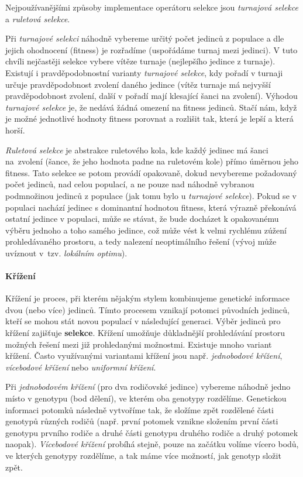 Nejpoužívanějšími způsoby implementace operátoru selekce jsou \emph{turnajová
selekce} a \emph{ruletová selekce}. 

Při \emph{turnajové selekci} náhodně vybereme určitý počet jedinců z
populace a dle jejich ohodnocení (fitness) je rozřadíme (uspořádáme turnaj mezi
jedinci). V tuto chvíli nejčastěji selekce vybere vítěze turnaje (nejlepšího
jedince z turnaje). Existují i pravděpodobnostní varianty \emph{turnajové
selekce}, kdy pořadí v turnaji určuje pravděpodobnost zvolení daného jedince
(vítěz turnaje má nejvyšší pravděpodobnost zvolení, další v pořadí mají
klesající šanci na zvolení). Výhodou \emph{turnajové selekce} je, že nedává
žádná omezení na fitness jedinců. Stačí nám, když je možné jednotlivé hodnoty
fitness porovnat a rozlišit tak, která je lepší a která horší.

\emph{Ruletová selekce} je abstrakce ruletového kola, kde každý jedinec má šanci
na~zvolení (šance, že jeho hodnota padne na ruletovém kole) přímo úměrnou jeho
fitness. Tato selekce se potom provádí opakovaně, dokud nevybereme požadovaný
počet jedinců, nad celou populací, a ne pouze nad náhodně vybranou podmnožinou
jedinců z populace (jak tomu bylo u \emph{turnajové selekce}). Pokud se v
populaci nachází jedinec s dominantní hodnotou fitness, která výrazně překonává
ostatní jedince v populaci, může se stávat, že bude docházet k opakovanému
výběru jednoho a toho samého jedince, což může vést k velmi rychlému zúžení
prohledávaného prostoru, a tedy nalezení neoptimálního řešení (vývoj může
uvíznout v~tzv. \emph{lokálním optimu}).

\paragraph{Křížení}
Křížení je proces, při kterém nějakým stylem kombinujeme genetické informace
dvou (nebo více) jedinců. Tímto procesem vznikají potomci původních jedinců,
kteří se mohou stát novou populací v následující generaci. Výběr jedinců pro
křížení zajišťuje \textbf{selekce}. Křížení umožňuje důkladnější prohledávání
prostoru možných řešení mezi již prohledanými možnostmi. Existuje mnoho variant
křížení. Často využívanými variantami křížení jsou např. \emph{jednobodové
křížení}, \emph{vícebodové křížení} nebo \emph{uniformní křížení}.

Při \emph{jednobodovém křížení} (pro dva rodičovské jedince) vybereme náhodně
jedno místo v genotypu (bod dělení), ve kterém oba genotypy rozdělíme.
Genetickou informaci potomků následně vytvoříme tak, že složíme zpět rozdělené
části genotypů různých rodičů (např. první potomek vznikne složením první části
genotypu prvního rodiče a druhé části genotypu druhého rodiče a druhý potomek
naopak). \emph{Vícebodové křížení} probíhá stejně, pouze na začátku volíme
vícero bodů, ve kterých genotypy rozdělíme, a tak máme více možností, jak
genotyp složit zpět.

